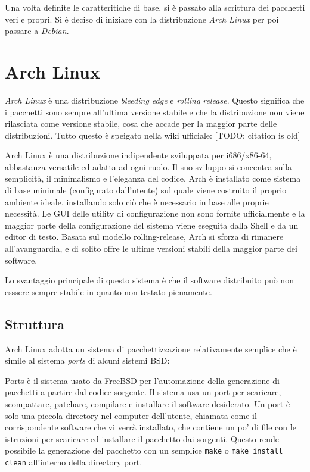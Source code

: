\documentclass[10pt,titlepage,twoside,a4paper]{report}
\begin{document}
Una volta definite le caratteritiche di base, si è passato alla scrittura dei
pacchetti veri e propri. Si è deciso di iniziare con la
distribuzione \emph{Arch Linux} per poi passare a \emph{Debian}.


\section{Arch Linux}
\emph{Arch Linux} è una distribuzione \emph{bleeding edge} e \emph{rolling 
release}. Questo significa che i pacchetti sono sempre all'ultima versione 
stabile e che la distribuzione non viene rilasciata come versione stabile, 
cosa che accade per la maggior parte delle distribuzioni. Tutto questo è 
speigato nella wiki ufficiale\cite{archLinux}:
[TODO: citation is old]
\begin{displayquote}
Arch Linux è una distribuzione indipendente sviluppata per i686/x86-64, 
abbastanza versatile ed adatta ad ogni ruolo. Il suo sviluppo si concentra 
sulla semplicità, il minimalismo e l'eleganza del codice. Arch è installato 
come sistema di base minimale (configurato dall'utente) sul quale viene 
costruito il proprio ambiente ideale, installando solo ciò che è necessario 
in base alle proprie necessità. Le GUI delle utility di configurazione non 
sono fornite ufficialmente e la maggior parte della configurazione del sistema viene 
eseguita dalla Shell e da un editor di testo. Basata sul modello 
rolling-release, Arch si sforza di rimanere all'avanguardia, e di solito offre 
le ultime versioni stabili della maggior parte dei software.
\end{displayquote}
Lo svantaggio principale di questo sistema è che il software distribuito 
può non esssere sempre stabile in quanto non testato pienamente.

\subsection{Struttura}
Arch Linux adotta un sistema di pacchettizzazione relativamente semplice 
che è simile al sistema \emph{ports} di alcuni sistemi 
BSD\cite{portsLikeSystem}:
\begin{displayquote}
Ports è il sistema usato da FreeBSD per l'automazione della generazione di 
pacchetti a partire dal codice sorgente. Il sistema usa un port per scaricare, 
scompattare, patchare, compilare e installare il software desiderato. Un port 
è solo una piccola directory nel computer dell'utente, chiamata come il 
corrispondente software che vi verrà installato, che contiene un po' di file 
con le istruzioni per scaricare ed installare il pacchetto dai sorgenti. Questo 
rende possibile la generazione del pacchetto con un semplice \texttt{make} o 
\texttt{make install clean} all'interno della directory port.
\end{displayquote}
\end{document}
